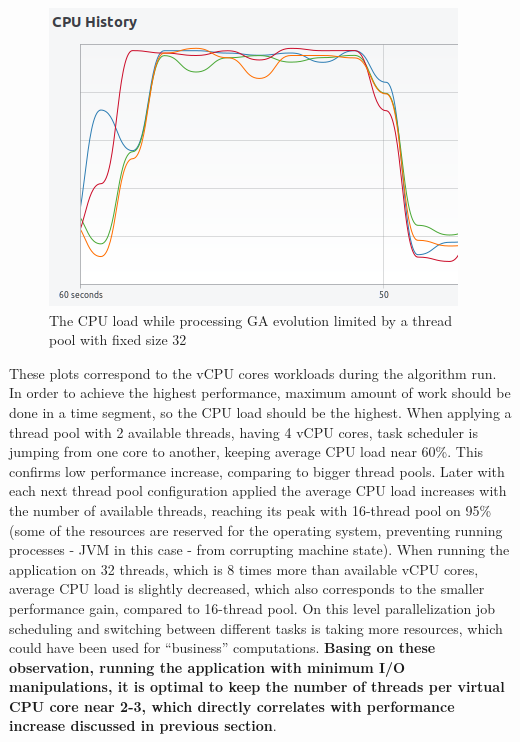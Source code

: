 \begin{figure}[h]
\centering\includegraphics[width=.8\textwidth]{img/exp/2/limit-threadpool-32}
\caption{The CPU load while processing GA evolution limited by a thread pool with fixed size 32 }  \label{img:cpu-thread-32}
\end{figure}

 These plots correspond to the vCPU cores workloads during the algorithm run. In order to achieve the highest performance, maximum amount of work should be done in a time segment, so the CPU load should be the highest. When applying a  thread pool with 2 available threads, having 4 vCPU cores, task scheduler is jumping from one core to another, keeping average CPU load near 60\%. This confirms low performance increase, comparing to bigger thread pools. Later with each next thread pool configuration applied the average CPU load increases with the number of available threads, reaching its peak with 16-thread pool on 95\% (some of the resources are reserved for the operating system, preventing running processes - JVM in this case - from corrupting machine state). When running the application on 32 threads, which is 8 times more than available vCPU cores, average CPU load is slightly decreased, which also corresponds to the smaller performance gain, compared to 16-thread pool. On this level parallelization job scheduling and switching between different tasks is taking more resources, which could have been used for ``business'' computations. \textbf{Basing on these observation, running the application with minimum I/O manipulations, it is optimal to keep the number of threads per virtual CPU core near 2-3, which directly correlates with performance increase discussed in previous section}.
